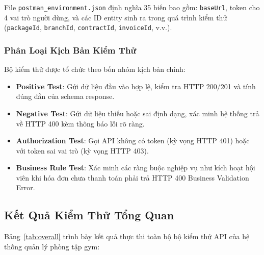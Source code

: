 File \texttt{postman\_environment.json} định nghĩa 35 biến bao gồm: \texttt{baseUrl}, token cho 4 vai trò người dùng, và các ID entity sinh ra trong quá trình kiểm thử (\texttt{packageId}, \texttt{branchId}, \texttt{contractId}, \texttt{invoiceId}, v.v.).

\subsubsection{Phân Loại Kịch Bản Kiểm Thử}

Bộ kiểm thử được tổ chức theo bốn nhóm kịch bản chính:

\begin{itemize}
    \item \textbf{Positive Test}: Gửi dữ liệu đầu vào hợp lệ, kiểm tra HTTP 200/201 và tính đúng đắn của schema response.
    \item \textbf{Negative Test}: Gửi dữ liệu thiếu hoặc sai định dạng, xác minh hệ thống trả về HTTP 400 kèm thông báo lỗi rõ ràng.
    \item \textbf{Authorization Test}: Gọi API không có token (kỳ vọng HTTP 401) hoặc với token sai vai trò (kỳ vọng HTTP 403).
    \item \textbf{Business Rule Test}: Xác minh các ràng buộc nghiệp vụ như kích hoạt hội viên khi hóa đơn chưa thanh toán phải trả HTTP 400 Business Validation Error.
\end{itemize}

\subsection{Kết Quả Kiểm Thử Tổng Quan}

Bảng~\ref{tab:overall} trình bày kết quả thực thi toàn bộ bộ kiểm thử API của hệ thống quản lý phòng tập gym:


